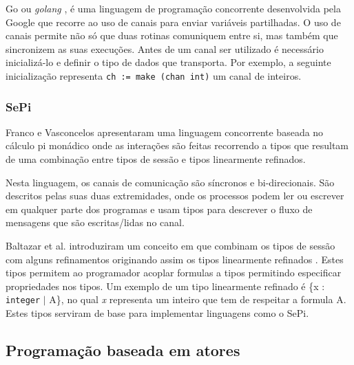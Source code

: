Go ou \textit{golang} \cite{ref-go}, é uma linguagem de programação concorrente desenvolvida pela Google que recorre ao uso de canais para enviar variáveis partilhadas. O uso de canais permite não só que duas rotinas comuniquem entre si, mas também que sincronizem as suas execuções. Antes de um canal ser utilizado é necessário inicializá-lo e definir o tipo de dados que transporta. Por exemplo, a seguinte inicialização representa \lstinline"ch := make (chan int)" um canal de inteiros.

\subsubsection{SePi}
\label{sec:sepi}
\lstset{language=Sepi}
Franco e Vasconcelos \cite{ref-sepi} apresentaram uma linguagem concorrente baseada no cálculo pi monádico onde as interações são feitas recorrendo a tipos que resultam de uma combinação entre tipos de sessão e tipos linearmente refinados.

Nesta linguagem, os canais de comunicação são síncronos e bi-direcionais. São descritos pelas suas duas extremidades, onde os processos podem ler ou escrever em qualquer parte dos programas e usam tipos para descrever o fluxo de mensagens que são escritas/lidas no canal.

Baltazar et al. introduziram um conceito em que combinam os tipos de sessão com alguns refinamentos originando assim os tipos linearmente refinados \cite{ref-lin-ref-st}. Estes tipos permitem ao programador acoplar formulas a tipos permitindo especificar propriedades nos tipos. Um exemplo de um tipo linearmente refinado é \{x : \lstinline"integer" $|$ A\}, no qual \textit{x} representa um inteiro que tem de respeitar a formula A. Estes tipos serviram de base para implementar linguagens como o SePi.

\subsection{Programação baseada em atores}
\label{sec:actors}





